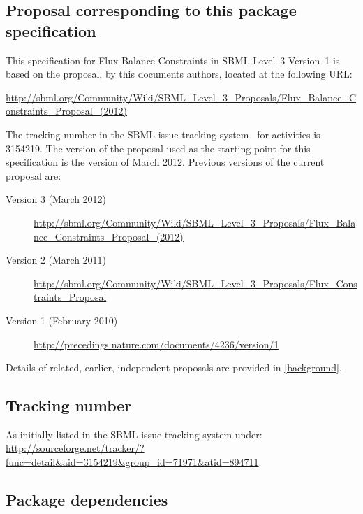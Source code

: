 \subsection{Proposal corresponding to this package specification}

This specification for Flux Balance Constraints in SBML Level~3
Version~1 is based on the proposal, by this documents authors, located
at the following URL:
\begin{center}
  \vspace*{1ex}\small
  \url{http://sbml.org/Community/Wiki/SBML_Level_3_Proposals/Flux_Balance_Constraints_Proposal_(2012)}
  \vspace*{1ex}
\end{center}

The tracking number in the SBML issue tracking system~\citep{tracker}
for \FBCPackage activities is 3154219. The version of the proposal used
as the starting point for this specification is the version of March
2012. Previous versions of the current proposal are:

\begin{description}
  \item[Version 3 (March 2012)]
  \item [] {\small\url{http://sbml.org/Community/Wiki/SBML_Level_3_Proposals/Flux_Balance_Constraints_Proposal_(2012)}}
  \item[Version 2 (March 2011)]
  \item [] {\small\url{http://sbml.org/Community/Wiki/SBML_Level_3_Proposals/Flux_Constraints_Proposal}}
  \item[Version 1 (February 2010)]
  \item [] {\small\url{http://precedings.nature.com/documents/4236/version/1}}
\end{description}

Details of related, earlier, independent proposals are provided in \ref{background}.

\subsection{Tracking number}
As initially listed in the SBML issue tracking system under:\\
\url{http://sourceforge.net/tracker/?func=detail&aid=3154219&group_id=71971&atid=894711}.

\subsection{Package dependencies}

